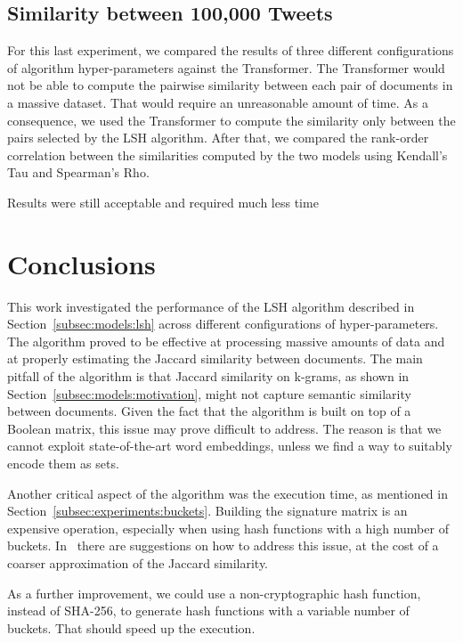 \documentclass[runningheads]{llncs}
\begin{document}
\subsection{Similarity between 100,000 Tweets}
\label{subsec:experiments:100k}

For this last experiment, we compared the results of three different configurations of algorithm hyper-parameters against the Transformer. The Transformer would not be able to compute the pairwise similarity between each pair of documents in a massive dataset. That would require an unreasonable amount of time. As a consequence, we used the Transformer to compute the similarity only between the pairs selected by the LSH algorithm. After that, we compared the rank-order correlation between the similarities computed by the two models using Kendall's Tau and Spearman's Rho.


Results were still acceptable and required much less time


\section{Conclusions}
\label{sec:conclusions}

This work investigated the performance of the LSH algorithm described in Section~\ref{subsec:models:lsh} across different configurations of hyper-parameters. The algorithm proved to be effective at processing massive amounts of data and at properly estimating the Jaccard similarity between documents. The main pitfall of the algorithm is that Jaccard similarity on k-grams, as shown in Section~\ref{subsec:models:motivation}, might not capture semantic similarity between documents. Given the fact that the algorithm is built on top of a Boolean matrix, this issue may prove difficult to address. The reason is that we cannot exploit state-of-the-art word embeddings, unless we find a way to suitably encode them as sets.

Another critical aspect of the algorithm was the execution time, as mentioned in Section~\ref{subsec:experiments:buckets}. Building the signature matrix is an expensive operation, especially when using hash functions with a high number of buckets. In~\cite{leskovec_2020} there are suggestions on how to address this issue, at the cost of a coarser approximation of the Jaccard similarity.

As a further improvement, we could use a non-cryptographic hash function, instead of SHA-256, to generate hash functions with a variable number of buckets. That should speed up the execution.
\end{document}
